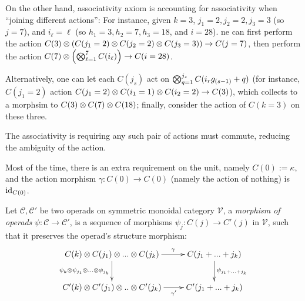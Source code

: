 \documentclass{article}
\begin{document}
On the other hand, associativity axiom is accounting for associativity when ``joining different actions'': For instance, given $k=3$, $j_1=2,j_2=2,j_3=3$ (so $j=7$), and $i_\ell=\ell$ (so $h_1 = 3, h_2=7, h_3 = 18$, and $i=28$). ne can first perform the action $C(3) \otimes (C(j_1=2)\otimes C(j_2=2)\otimes C(j_3=3))\rightarrow C(j=7)$, then perform the action $C(7)\otimes \left(\bigotimes_{\ell=1}^7 C(i_\ell)\right)\rightarrow C(i=28)$. 

Alternatively, one can let each $C(j_s)$ act on $\bigotimes_{q=1}^{j_s}C(i_r{g_{(s-1)}+q})$ (for instance, $C(j_1=2)$ action $C(j_1=2)\otimes C(i_1=1)\otimes C(i_2=2)\rightarrow C(3)$), which collects to a morphsim to $C(3)\otimes C(7)\otimes C(18)$; finally, consider the action of $C(k=3)$ on these three.

The associativity is requiring any such pair of actions must commute, reducing the ambiguity of the action.

\begin{rem}
    Most of the time, there is an extra requirement on the unit, namely $C(0):= \kappa$, and the action morphism $\gamma:C(0)\rightarrow C(0)$ (namely the action of nothing) is $\mathrm{id}_{C(0)}$.
\end{rem}

\begin{defn}
    Let $\mathcal{C},\mathcal{C}'$ be two operads on symmetric monoidal category $\mathcal{V}$, a \emph{morphism of operads} $\psi:\mathcal{C}\rightarrow \mathcal{C}'$, is a sequence of morphisms $\psi_j:C(j)\rightarrow C'(j)$ in $\mathcal{V}$, such that it preserves the operad's structure morphism:
    \[\xymatrix{
        C(k)\tensor C(j_1)\tensor...\tensor C(j_k) \ar[d]_-{\psi_k\tensor \psi_{j_1}\tensor...\tensor \psi_{j_k}} \ar[r]^-{\gamma} & C(j_1+...+j_k) \ar[d]^-{\psi_{j_1+...+j_k}}\\
        C'(k)\tensor C'(j_1)\tensor ..\tensor C'(j_k) \ar[r]_-{\gamma'} & C'(j_1+...+j_k)
    }\]
\end{defn}

\hfil
\end{document}
